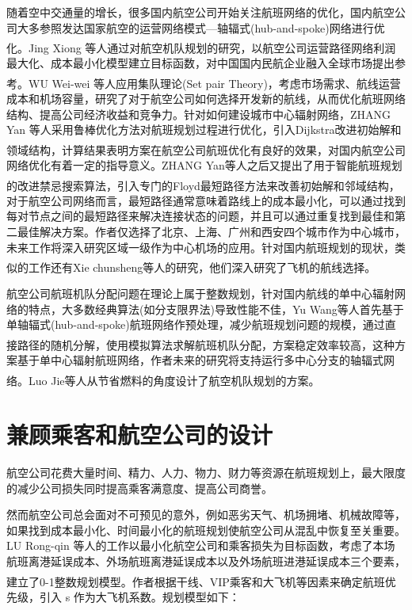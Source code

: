 \documentclass[runningheads]{llncs}
\newcommand{\upcite}[1]{\textsuperscript{\textsuperscript{\cite{#1}}}}
\begin{document}
随着空中交通量的增长，很多国内航空公司开始关注航班网络的优化，国内航空公司大多参照发达国家航空的运营网络模式---轴辐式(hub-and-spoke)网络进行优化。Jing Xiong 等人通过对航空机队规划的研究\upcite{ref_article14}，以航空公司运营路径网络利润最大化、成本最小化模型建立目标函数，对中国国内民航企业融入全球市场提出参考。WU Wei-wei 等人应用集队理论(Set pair Theory)\upcite{ref_article25}，考虑市场需求、航线运营成本和机场容量，研究了对于航空公司如何选择开发新的航线，从而优化航班网络结构、提高公司经济收益和竞争力。针对如何建设城市中心辐射网络，ZHANG Yan 等人采用鲁棒优化方法对航班规划过程进行优化，引入Dijkstra改进初始解和领域结构\upcite{ref_article12}，计算结果表明方案在航空公司航班优化有良好的效果，对国内航空公司网络优化有着一定的指导意义。ZHANG Yan等人之后又提出了用于智能航班规划的改进禁忌搜索算法\upcite{ref_article11}，引入专门的Floyd最短路径方法来改善初始解和邻域结构，对于航空公司网络而言，最短路径通常意味着路线上的成本最小化，可以通过找到每对节点之间的最短路径来解决连接状态的问题，并且可以通过重复找到最佳和第二最佳解决方案。作者仅选择了北京、上海、广州和西安四个城市作为中心城市，未来工作将深入研究区域一级作为中心机场的应用。针对国内航班规划的现状，类似的工作还有Xie chunsheng等人\upcite{ref_article35}的研究，他们深入研究了飞机的航线选择。

航空公司航班机队分配问题在理论上属于整数规划，针对国内航线的单中心辐射网络的特点，大多数经典算法(如分支限界法)导致性能不佳，Yu Wang等人首先基于单轴辐式(hub-and-spoke)航班网络作预处理，减少航班规划问题的规模，通过直接路径的随机分解，使用模拟算法求解航班机队分配\upcite{ref_article13}，方案稳定效率较高，这种方案基于单中心辐射航班网络，作者未来的研究将支持运行多中心分支的轴辐式网络。Luo Jie等人\upcite{ref_article36}从节省燃料的角度设计了航空机队规划的方案。


\section{兼顾乘客和航空公司的设计}
航空公司花费大量时间、精力、人力、物力、财力等资源在航班规划上，最大限度的减少公司损失同时提高乘客满意度、提高公司商誉。

然而航空公司总会面对不可预见的意外，例如恶劣天气、机场拥堵、机械故障等，如果找到成本最小化、时间最小化的航班规划使航空公司从混乱中恢复至关重要。LU Rong-qin 等人的工作以最小化航空公司和乘客损失为目标函数，考虑了本场航班离港延误成本、外场航班离港延误成本以及外场航班进港延误成本三个要素，建立了0-1整数规划模型\upcite{ref_article5}。作者根据干线、VIP乘客和大飞机等因素来确定航班优先级，引入 s 作为大飞机系数。规划模型如下：
\end{document}
